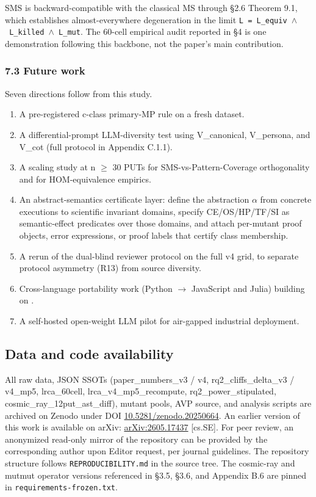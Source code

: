 \documentclass[review,12pt,authoryear]{elsarticle}
\begin{document}
SMS is backward-compatible with the classical MS through §2.6 Theorem
9.1, which establishes almost-everywhere degeneration in the limit
\texttt{L\ =\ L\_equiv\ $\wedge$\ L\_killed\ $\wedge$\ L\_mut}. The 60-cell empirical
audit reported in §4 is one demonstration following this backbone, not
the paper's main contribution.

\subsubsection{7.3 Future work}\label{future-work-and-p-series-roadmap}

Seven directions follow from this study.

\begin{enumerate}
\def\labelenumi{(\alph{enumi})}
\item
  A pre-registered c-class primary-MP rule on a fresh dataset.
\item
  A differential-prompt LLM-diversity test using V\_canonical,
  V\_persona, and V\_cot (full protocol in Appendix C.1.1).
\item
  A scaling study at n $\geq$ 30 PUTs for SMS-vs-Pattern-Coverage
  orthogonality and for HOM-equivalence empirics.
\item
  An abstract-semantics certificate layer: define the abstraction
  $\alpha$ from concrete executions to scientific invariant domains,
  specify CE/OS/HP/TF/SI as semantic-effect predicates over those
  domains, and attach per-mutant proof objects, error expressions, or
  proof labels that certify class membership.
\item
  A rerun of the dual-blind reviewer protocol on the full v4 grid, to
  separate protocol asymmetry (R13) from source diversity.
\item
  Cross-language portability work (Python $\to$ JavaScript and Julia)
  building on \citet{tip2025llmorpheus}.
\item
  A self-hosted open-weight LLM pilot for air-gapped industrial
  deployment.
\end{enumerate}


\subsection{Data and code availability}\label{data-and-code-availability}

All raw data, JSON SSOTs (paper\_numbers\_v3 / v4,
rq2\_cliffs\_delta\_v3 / v4\_mp5, lrca\_60cell,
lrca\_v4\_mp5\_recompute, rq2\_power\_stipulated,
cosmic\_ray\_12put\_ast\_diff), mutant pools, AVP source, and analysis
scripts are archived on Zenodo under DOI
\href{https://doi.org/10.5281/zenodo.20250664}{10.5281/zenodo.20250664}.
An earlier version of this work is available on arXiv:
\href{https://arxiv.org/abs/2605.17437}{arXiv:2605.17437} [cs.SE].
For peer review, an anonymized read-only mirror of the repository can
be provided by the corresponding author upon Editor request, per journal
guidelines. The repository structure follows
\texttt{REPRODUCIBILITY.md} in the source tree. The cosmic-ray and
mutmut operator versions referenced in §3.5, §3.6, and Appendix B.6 are
pinned in \texttt{requirements-frozen.txt}.
\end{document}
